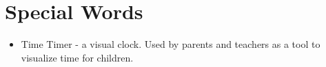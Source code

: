 \chapter*{Special Words}

\begin{itemize}

	\item Time Timer - a visual clock. Used by parents and teachers as a tool to visualize time for children.

\end{itemize}